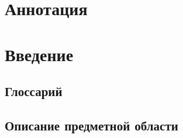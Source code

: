 \documentclass{fefu}
\begin{document}
  \makereporttitle

  \tableofcontents
  \pagebreak

  \section*{Аннотация}
  
  \pagebreak

  \section{Введение}

  \subsection{Глоссарий}
  

  \subsection{Описание предметной области}
  
\end{document}
